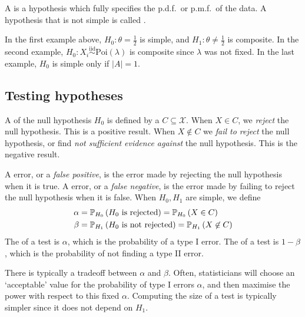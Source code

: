 \begin{definition}
	A  is a hypothesis which fully specifies the p.d.f.\ or p.m.f.\ of the data.
	A hypothesis that is not simple is called .
\end{definition}

\begin{example}
	In the first example above, $H_0 \colon \theta = \frac{1}{2}$ is simple, and $H_1 \colon \theta \neq \frac{1}{2}$ is composite.
	In the second example, $H_0 \colon X_i \overset{\mathrm{iid}}{\sim} \mathrm{Poi}(\lambda)$ is composite since $\lambda$ was not fixed.
	In the last example, $H_0$ is simple only if $|A| = 1$.
\end{example}

\subsection{Testing hypotheses}
\begin{definition}
	A  of the null hypothesis $H_0$ is defined by a  $C \subseteq \mathcal X$.
	When $X \in C$, we \textit{reject} the null hypothesis.
	This is a positive result.
	When $X \not\in C$ we \textit{fail to reject} the null hypothesis, or find \textit{not sufficient evidence against} the null hypothesis.
	This is the negative result.
\end{definition}

\begin{definition}
	A  error, or a \textit{false positive}, is the error made by rejecting the null hypothesis when it is true.
	A  error, or a \textit{false negative}, is the error made by failing to reject the null hypothesis when it is false.
	When $H_0, H_1$ are simple, we define
	\begin{align*}
		\alpha &= \mathbb{P}_{H_0}\left({H_0 \text{ is rejected}}\right) = \mathbb{P}_{H_0}\left({X \in C}\right) \\
		\beta &= \mathbb{P}_{H_1}\left({H_0 \text{ is not rejected}}\right) = \mathbb{P}_{H_1}\left({X \not\in C}\right)
	\end{align*}
	The  of a test is $\alpha$, which is the probability of a type I error.
	The  of a test is $1 - \beta$, which is the probability of not finding a type II error.
\end{definition}

\begin{remark}
	There is typically a tradeoff between $\alpha$ and $\beta$.
	Often, statisticians will choose an `acceptable' value for the probability of type I errors $\alpha$, and then maximise the power with respect to this fixed $\alpha$.
	Computing the size of a test is typically simpler since it does not depend on $H_1$.
\end{remark} 

